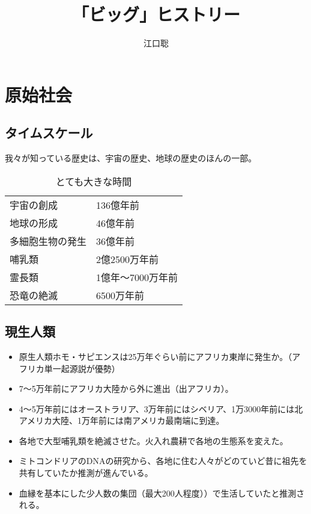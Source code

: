 \documentclass[autodetect-engine,dvipdfmx-if-dvi,ja=standard]{bxjsarticle} \usepackage{mystyle}
\author{江口聡}
\title{「ビッグ」ヒストリー}
\begin{document}
\maketitle
\else\chapter{}
\chapter{原始社会}
\fi

\section{タイムスケール}


我々が知っている歴史は、宇宙の歴史、地球の歴史のほんの一部。


\begin{table}
\caption{とても大きな時間}  
  \centering
  \begin{tabular}{l l}
    宇宙の創成 & 136億年前 \\
    地球の形成 & 46億年前 \\
    多細胞生物の発生 & 36億年前 \\
    哺乳類 & 2億2500万年前 \\
    霊長類 & 1億年〜7000万年前 \\
    恐竜の絶滅 & 6500万年前 \\
  \end{tabular}
\end{table}





\section{現生人類}

\begin{itemize}
\item 原生人類ホモ・サピエンスは25万年ぐらい前にアフリカ東岸に発生か。（アフリカ単一起源説が優勢）
\item 7〜5万年前にアフリカ大陸から外に進出（出アフリカ）。
\item 4〜5万年前にはオーストラリア、3万年前にはシベリア、1万3000年前には北アメリカ大陸、1万年前には南アメリカ最南端に到達。
\item   各地で大型哺乳類を絶滅させた。火入れ農耕で各地の生態系を変えた。
\item ミトコンドリアのDNAの研究から、各地に住む人々がどのていど昔に祖先を共有していたか推測が進んでいる。
\item 血縁を基本にした少人数の集団（最大200人程度））で生活していたと推測される。
\end{itemize}
\end{document}
